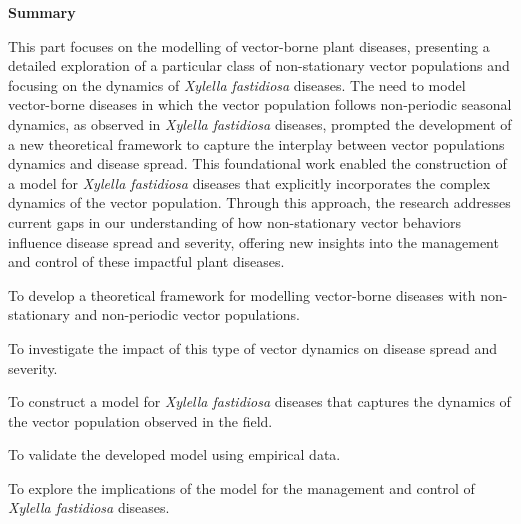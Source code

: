 \thispagestyle{empty}

\begin{center}
    \textbf{\Large Summary}
\end{center}

This part focuses on the modelling of vector-borne plant diseases, presenting a
detailed exploration of a particular class of non-stationary vector
populations and focusing on the dynamics of \textit{Xylella fastidiosa}
diseases. The need to model vector-borne diseases in which the vector
population follows non-periodic seasonal dynamics, as observed in
\textit{Xylella fastidiosa} diseases, prompted the development of a new
theoretical framework to capture the interplay between vector
populations dynamics and disease spread. This foundational work enabled the
construction of a model for \textit{Xylella fastidiosa} diseases that
explicitly incorporates the complex dynamics of the vector population. Through
this approach, the research addresses current gaps in our understanding of how
non-stationary vector behaviors influence disease spread and severity, offering
new insights into the management and control of these impactful plant diseases.

\vspace{2cm}

\begin{objectiveslist}
    \item To develop a theoretical framework for modelling vector-borne
    diseases with non-stationary and non-periodic vector populations.

    \item To investigate the impact of this type of vector dynamics on
    disease spread and severity.

    \item To construct a model for \textit{Xylella fastidiosa} diseases that
    captures the dynamics of the vector population observed in the field.

    \item To validate the developed model using empirical data.

    \item To explore the implications of the model for the management and
    control of \textit{Xylella fastidiosa} diseases.
\end{objectiveslist}

\vspace{2cm}

